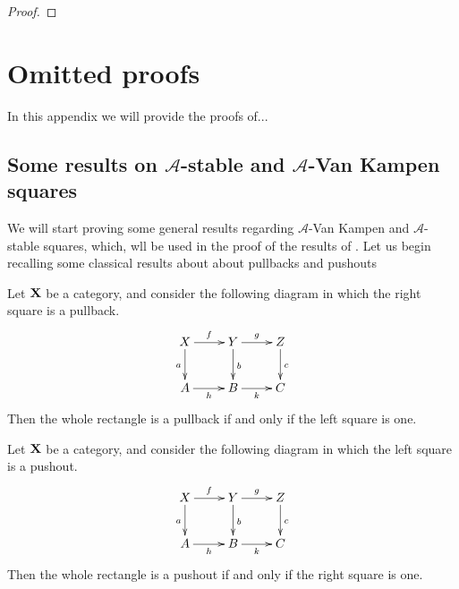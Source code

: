 \documentclass[a4paper,UKenglish,cleveref,pdftex, thm-restate,numberwithinsect]{lipics}
\def\X{\textbf {\textup{X}}}
\begin{document}
\begin{example}
\end{example}

\begin{lemma}
\end{lemma}
\begin{proof}
	\qedhere 
\end{proof}


\begin{definition}
\end{definition}

\begin{remark}
\end{remark}
\begin{corollary}
\end{corollary}

\begin{corollary}
\end{corollary}



\section{Omitted proofs}
In this appendix we will provide the proofs of...

\subsection{Some results on $\mathcal{A}$-stable and $\mathcal{A}$-Van Kampen squares}
We will start proving some general results regarding $\mathcal{A}$-Van Kampen and $\mathcal{A}$-stable squares, which, wll be used in the proof of the results of . Let us begin recalling some classical results about  about pullbacks and pushouts

\begin{lemma}\label{lem:popb1} \label{lem:pb1}
	Let $\X$ be a category, and consider the following diagram 	in which the right square is a pullback.
	\[\xymatrix{X \ar[d]_{a} \ar[r]^{f}& \ar[r]^{g} Y \ar[d]^{b}& Z \ar[d]^{c}\\ A \ar[r]_{h}& B \ar[r]_{k}& C}\]
	Then the whole rectangle is a pullback if and only if the left square is one.
\end{lemma}

\begin{lemma}\label{lem:po1}
	Let $\X$ be a category, and consider the following diagram 	in which the left square is a pushout.
	\[\xymatrix{X \ar[d]_{a} \ar[r]^{f}& \ar[r]^{g} Y \ar[d]^{b}& Z \ar[d]^{c}\\ A \ar[r]_{h}& B \ar[r]_{k}& C}\]
	Then the whole rectangle is a pushout if and only if the right square is one.
\end{lemma}
\end{document}
